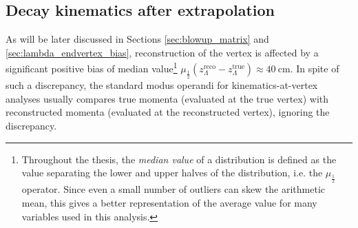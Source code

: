 %
%
%


\subsection{Decay kinematics after extrapolation}
\label{sec:3:true_vtx_kinematics}
As will be later discussed in Sections \ref{sec:blowup_matrix} and \ref{sec:lambda_endvertex_bias}, reconstruction of the \lz vertex is affected by a significant positive bias of median value\footnote{Throughout the thesis, the \textit{median value} of a distribution is defined as the value separating the lower and upper halves of the distribution, i.e. the $\mu_\frac{1}{2}$ operator. Since even a small number of outliers can skew the arithmetic mean, this gives a better representation of the average value for many variables used in this analysis.} $\mu_\frac{1}{2} \left(z_\Lambda^\text{reco} - z_\Lambda^\text{true}\right) \approx \SI{40}{\centi\meter}$.
In spite of such a discrepancy, the standard modus operandi for kine\-matics-at-vertex analyses usually compares true momenta (evaluated at the true vertex) with reconstructed momenta (evaluated at the reconstructed vertex), ignoring the discrepancy.

